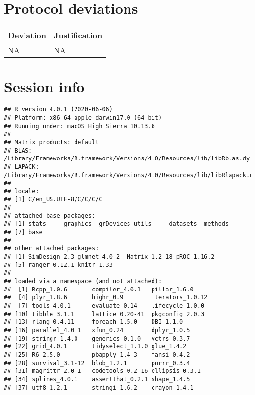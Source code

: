 \documentclass[a4paper, 11pt]{article}\usepackage[]{graphicx}\usepackage[]{color}
\makeatletter
\newenvironment{kframe}{%
 \def\at@end@of@kframe{}%
 \ifinner\ifhmode%
  \def\at@end@of@kframe{\end{minipage}}%
  \begin{minipage}{\columnwidth}%
 \fi\fi%
 \def\FrameCommand##1{\hskip\@totalleftmargin \hskip-\fboxsep
 \colorbox{shadecolor}{##1}\hskip-\fboxsep
     \hskip-\linewidth \hskip-\@totalleftmargin \hskip\columnwidth}%
 \MakeFramed {\advance\hsize-\width
   \@totalleftmargin\z@ \linewidth\hsize
   \@setminipage}}%
 {\par\unskip\endMakeFramed%
 \at@end@of@kframe}
\newenvironment{knitrout}{}{} %
\makeatother
\begin{document}




\section{Protocol deviations}

\begin{tabular}{ll}
\hline
Deviation & Justification \\
\hline
NA & NA \\
\hline
\end{tabular}


\section{Session info}

\begin{knitrout}
\color{fgcolor}\begin{kframe}


{\ttfamily\noindent\bfseries\color{errorcolor}{\#\# Error in library(ainet): there is no package called 'ainet'}}\begin{verbatim}
## R version 4.0.1 (2020-06-06)
## Platform: x86_64-apple-darwin17.0 (64-bit)
## Running under: macOS High Sierra 10.13.6
## 
## Matrix products: default
## BLAS:   /Library/Frameworks/R.framework/Versions/4.0/Resources/lib/libRblas.dylib
## LAPACK: /Library/Frameworks/R.framework/Versions/4.0/Resources/lib/libRlapack.dylib
## 
## locale:
## [1] C/en_US.UTF-8/C/C/C/C
## 
## attached base packages:
## [1] stats     graphics  grDevices utils     datasets  methods  
## [7] base     
## 
## other attached packages:
## [1] SimDesign_2.3 glmnet_4.0-2  Matrix_1.2-18 pROC_1.16.2  
## [5] ranger_0.12.1 knitr_1.33   
## 
## loaded via a namespace (and not attached):
##  [1] Rcpp_1.0.6       compiler_4.0.1   pillar_1.6.0    
##  [4] plyr_1.8.6       highr_0.9        iterators_1.0.12
##  [7] tools_4.0.1      evaluate_0.14    lifecycle_1.0.0 
## [10] tibble_3.1.1     lattice_0.20-41  pkgconfig_2.0.3 
## [13] rlang_0.4.11     foreach_1.5.0    DBI_1.1.0       
## [16] parallel_4.0.1   xfun_0.24        dplyr_1.0.5     
## [19] stringr_1.4.0    generics_0.1.0   vctrs_0.3.7     
## [22] grid_4.0.1       tidyselect_1.1.0 glue_1.4.2      
## [25] R6_2.5.0         pbapply_1.4-3    fansi_0.4.2     
## [28] survival_3.1-12  blob_1.2.1       purrr_0.3.4     
## [31] magrittr_2.0.1   codetools_0.2-16 ellipsis_0.3.1  
## [34] splines_4.0.1    assertthat_0.2.1 shape_1.4.5     
## [37] utf8_1.2.1       stringi_1.6.2    crayon_1.4.1
\end{verbatim}
\end{kframe}
\end{knitrout}


% 
% 
\end{document}
